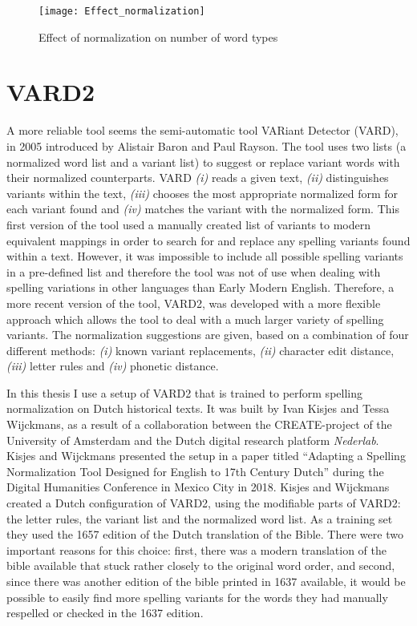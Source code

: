 \begin{figure}[hbt!]
	\centering
	\texttt{[image: Effect\_normalization]}
	\caption{Effect of normalization on number of word types}
	\label{fig:NormWordtypes}
\end{figure}

\section{VARD2}
A more reliable tool seems the semi-automatic tool VARiant Detector (VARD), in 2005 introduced by Alistair Baron and Paul Rayson. The tool uses two lists (a normalized word list and a variant list) to suggest or replace variant words with their normalized counterparts. VARD \textit{(i)} reads a given text, \textit{(ii)} distinguishes variants within the text, \textit{(iii)} chooses the most appropriate normalized form for each variant found and \textit{(iv)} matches the variant with the normalized form.\autocite{archer_guidelines_2015} This first version of the tool used a manually created list of variants to modern equivalent mappings in order to search for and replace any spelling variants found within a text. However, it was impossible to include all possible spelling variants in a pre-defined list and therefore the tool was not of use when dealing with spelling variations in other languages than Early Modern English. Therefore, a more recent version of the tool, VARD2, was developed with a more flexible approach which allows the tool to deal with a much larger variety of spelling variants. The normalization suggestions are given, based on a combination of four different methods: \textit{(i)} known variant replacements, \textit{(ii)} character edit distance, \textit{(iii)} letter rules and \textit{(iv)} phonetic distance. \autocite{baron_vard_nodate}

In this thesis I use a setup of VARD2 that is trained to perform spelling normalization on Dutch historical texts. It was built by Ivan Kisjes and Tessa Wijckmans, as a result of a collaboration between the CREATE-project of the University of Amsterdam and the Dutch digital research platform \textit{Nederlab}. Kisjes and Wijckmans presented the setup in a paper titled \enquote{Adapting a Spelling Normalization Tool Designed for English to 17th Century Dutch} during the Digital Humanities Conference in Mexico City in 2018.\autocite{kisjes_adapting_2018} Kisjes and Wijckmans created a Dutch configuration of VARD2, using the modifiable parts of VARD2: the letter rules, the variant list and the normalized word list. As a training set they used the 1657 edition of the Dutch translation of the Bible. There were two important reasons for this choice: first, there was a modern translation of the bible available that stuck rather closely to the original word order, and second, since there was another edition of the bible printed in 1637 available, it would be possible to easily find more spelling variants for the words they had manually respelled or checked in the 1637 edition.

